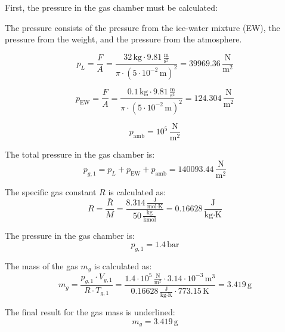 First, the pressure in the gas chamber must be calculated:  

The pressure consists of the pressure from the ice-water mixture (EW), the pressure from the weight, and the pressure from the atmosphere.  

\[
p_L = \frac{F}{A} = \frac{32 \, \text{kg} \cdot 9.81 \, \frac{\text{m}}{\text{s}^2}}{\pi \cdot (5 \cdot 10^{-2} \, \text{m})^2} = 39969.36 \, \frac{\text{N}}{\text{m}^2}
\]  

\[
p_{\text{EW}} = \frac{F}{A} = \frac{0.1 \, \text{kg} \cdot 9.81 \, \frac{\text{m}}{\text{s}^2}}{\pi \cdot (5 \cdot 10^{-2} \, \text{m})^2} = 124.304 \, \frac{\text{N}}{\text{m}^2}
\]  

\[
p_{\text{amb}} = 10^5 \, \frac{\text{N}}{\text{m}^2}
\]  

The total pressure in the gas chamber is:  
\[
p_{g,1} = p_L + p_{\text{EW}} + p_{\text{amb}} = 140093.44 \, \frac{\text{N}}{\text{m}^2}
\]  

The specific gas constant \( R \) is calculated as:  
\[
R = \frac{\bar{R}}{M} = \frac{8.314 \, \frac{\text{J}}{\text{mol·K}}}{50 \, \frac{\text{kg}}{\text{kmol}}} = 0.16628 \, \frac{\text{J}}{\text{kg·K}}
\]  

The pressure in the gas chamber is:  
\[
p_{g,1} = 1.4 \, \text{bar}
\]  

The mass of the gas \( m_g \) is calculated as:  
\[
m_g = \frac{p_{g,1} \cdot V_{g,1}}{R \cdot T_{g,1}} = \frac{1.4 \cdot 10^5 \, \frac{\text{N}}{\text{m}^2} \cdot 3.14 \cdot 10^{-3} \, \text{m}^3}{0.16628 \, \frac{\text{J}}{\text{kg·K}} \cdot 773.15 \, \text{K}} = 3.419 \, \text{g}
\]  

The final result for the gas mass is underlined:  
\[
m_g = 3.419 \, \text{g}
\]